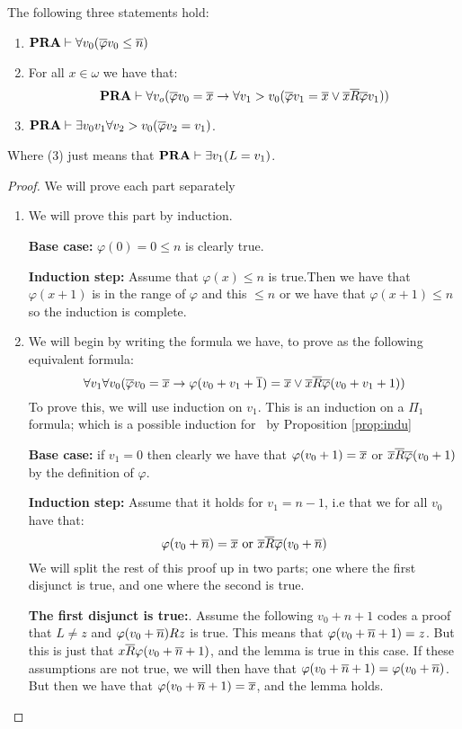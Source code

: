 \documentclass[../main.tex]{subfiles}
\begin{document}
\begin{lem}
	\label{lem:2}
	The following three statements hold:
	\begin{enumerate}
		\item $\text{\textbf{PRA}}\vdash\forall v_0(\overline \varphi v_0\leq \overline n)$
		\item For all $x\in\omega$ we have that:\ $$\text{\textbf{PRA}}\vdash\forall
			v_o(\overline
			\varphi v_0=\overline x\rightarrow\forall v_1>v_0(\overline \varphi v_1=\overline x\vee
			\overline x\overline R\overline \varphi v_1))$$
		\item $\text{\textbf{PRA}}\vdash\exists v_0v_1\forall v_2>v_0(\overline \varphi v_2=v_1)$. 
	\end{enumerate}
	Where (3) just means that $\text{\textbf{PRA}}\vdash\exists v_1(L=v_1)$.
\end{lem}
\begin{proof}

	We will prove each part separately 

	\begin{enumerate}

		\item We will prove this part by induction.

			\textbf{Base case:} $\varphi(0)=0\leq n$ is clearly true.

			\textbf{Induction step:} Assume that $\varphi(x)\leq n$ is
			true.Then we have that $\varphi(x+1)$ is in the range
			of $\varphi$
			and this $\leq n$ or we have that $\varphi(x+1)\leq n$ so the
			induction is complete.
		\item We will begin by writing the formula we have, to prove as
			the following equivalent formula:
			$$\forall v_1\forall v_0(\overline{\varphi}v_0=\overline x\rightarrow
			\varphi(v_0 + v_1+\overline 1)=\overline x\vee \overline x\overline R\overline
			\varphi(v_0+v_1+1))$$
			To prove this, we will use induction on $v_1$. This is
			an induction on a $\Pi_1$ formula; which is a possible
			induction for \PRA\ by Proposition \ref{prop:indu}

			\textbf{Base case:} if $v_1=0$ then clearly we have that
			$\varphi(v_0+1)=\overline x$ or $\overline x\overline R\overline
			\varphi(v_0+1)$ by the definition of $\varphi$.

			\textbf{Induction step:} Assume that it holds for
			$v_1=n-1$, i.e that we for all $v_0$ have that:
			\[\varphi(v_0+\ol n)=\ol x\ \text{or}\ \ol x\ol
			R\ol\varphi(v_0+\ol n)\]
			We will split the rest of this proof up in two parts;
			one where the first disjunct is true, and one where the
			second is true.

			\textbf{The first disjunct is true:}. Assume the
			following
			$v_0+n+1$ codes a proof that $L\not =z$ and
			$\varphi(v_0+\overline n) Rz$ is true. This means that
			$\varphi(v_0+\overline n+1)=z$. But this is just that $x\overline
			R\varphi(v_0+\overline n+1)$, and the lemma is true in this case.
			If these assumptions are not true, we will then have
			that $\varphi(v_0+\overline n+1)=\varphi(v_0+\overline n)$. But
			then we have that $\varphi(v_0+\overline n+1)=\overline x$, and the
			lemma holds.
			

\end{enumerate}
\end{proof}
\end{document}
